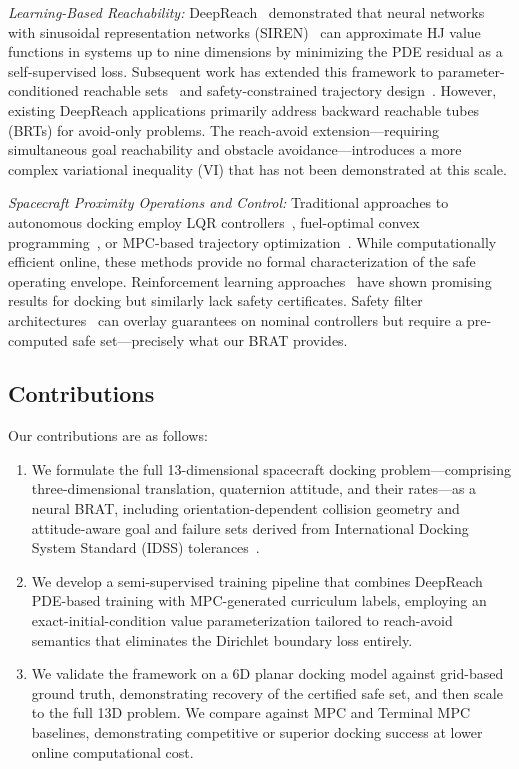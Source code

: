 \documentclass[letterpaper, 10 pt, conference]{ieeeconf}
\begin{document}
\textit{Learning-Based Reachability:}
DeepReach~\cite{bansal2021deepreach} demonstrated that neural networks with sinusoidal representation networks (SIREN)~\cite{sitzmann2020siren} can approximate HJ value functions in systems up to nine dimensions by minimizing the PDE residual as a self-supervised loss. Subsequent work has extended this framework to parameter-conditioned reachable sets~\cite{borquez2023} and safety-constrained trajectory design~\cite{shao2023}. However, existing DeepReach applications primarily address backward reachable tubes (BRTs) for avoid-only problems. The reach-avoid extension---requiring simultaneous goal reachability and obstacle avoidance---introduces a more complex variational inequality (VI) that has not been demonstrated at this scale.

\textit{Spacecraft Proximity Operations and Control:}
Traditional approaches to autonomous docking employ LQR controllers~\cite{jewison2016}, fuel-optimal convex programming~\cite{malyuta2022}, or MPC-based trajectory optimization~\cite{eren2015}. While computationally efficient online, these methods provide no formal characterization of the safe operating envelope. Reinforcement learning approaches~\cite{hovell2021, broida2019} have shown promising results for docking but similarly lack safety certificates. Safety filter architectures~\cite{wabersich2021, ames2019cbf} can overlay guarantees on nominal controllers but require a pre-computed safe set---precisely what our BRAT provides.

\subsection{Contributions}

Our contributions are as follows:
\begin{enumerate}
\item We formulate the full 13-dimensional spacecraft docking problem---comprising three-dimensional translation, quaternion attitude, and their rates---as a neural BRAT, including orientation-dependent collision geometry and attitude-aware goal and failure sets derived from International Docking System Standard (IDSS) tolerances~\cite{nasaidss}.
\item We develop a semi-supervised training pipeline that combines DeepReach PDE-based training with MPC-generated curriculum labels, employing an exact-initial-condition value parameterization tailored to reach-avoid semantics that eliminates the Dirichlet boundary loss entirely.
\item We validate the framework on a 6D planar docking model against grid-based ground truth, demonstrating recovery of the certified safe set, and then scale to the full 13D problem. We compare against MPC and Terminal MPC baselines, demonstrating competitive or superior docking success at lower online computational cost.
\end{enumerate}
\end{document}
